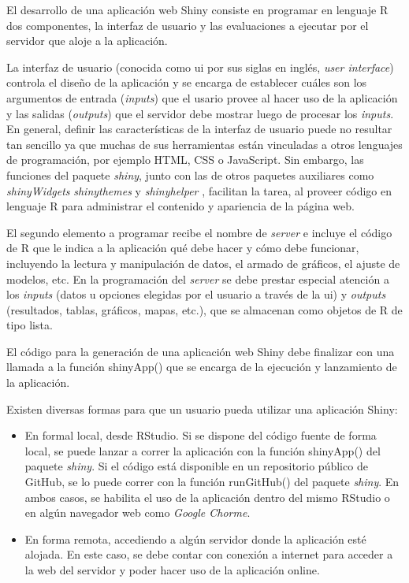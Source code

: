 El desarrollo de una aplicación web Shiny consiste en programar en lenguaje R dos componentes, la interfaz de usuario y las evaluaciones a ejecutar por el servidor que aloje a la aplicación.

La interfaz de usuario (conocida como ui por sus siglas en inglés, \emph{user interface}) controla el diseño de la aplicación y se encarga de establecer cuáles son los argumentos de entrada (\emph{inputs}) que el usario provee al hacer uso de la aplicación y las salidas (\emph{outputs}) que el servidor debe mostrar luego de procesar los \emph{inputs}. En general, definir las características de la interfaz de usuario puede no resultar tan sencillo ya que muchas de sus herramientas están vinculadas a otros lenguajes de programación, por ejemplo HTML, CSS o JavaScript. Sin embargo, las funciones del paquete \emph{shiny}, junto con las de otros paquetes auxiliares como \emph{shinyWidgets} \citep{Perrieretal2020} \emph{shinythemes} \citep{Chang2018} y \emph{shinyhelper} \citep{Mason2019}, facilitan la tarea, al proveer código en lenguaje R para administrar el contenido y apariencia de la página web.

El segundo elemento a programar recibe el nombre de \emph{server} e incluye el código de R que le indica a la aplicación qué debe hacer y cómo debe funcionar, incluyendo la lectura y manipulación de datos, el armado de gráficos, el ajuste de modelos, etc. En la programación del \emph{server} se debe prestar especial atención a los \emph{inputs} (datos u opciones elegidas por el usuario a través de la ui) y \emph{outputs} (resultados, tablas, gráficos, mapas, etc.), que se almacenan como objetos de R de tipo lista.

El código para la generación de una aplicación web Shiny debe finalizar con una llamada a la función \textcolor{fandango}{shinyApp()} que se encarga de la ejecución y lanzamiento de la aplicación.

Existen diversas formas para que un usuario pueda utilizar una aplicación Shiny:

\begin{itemize}

\item En formal local, desde RStudio. Si se dispone del código fuente de forma local, se puede lanzar a correr la aplicación con la función \textcolor{fandango}{shinyApp()} del paquete \emph{shiny}. Si el código está disponible en un repositorio público de GitHub, se lo puede correr con la función \textcolor{fandango}{runGitHub()} del paquete \emph{shiny}. En ambos casos, se habilita el uso de la aplicación dentro del mismo RStudio o en algún navegador web como \emph{Google Chorme}.

\item En forma remota, accediendo a algún servidor donde la aplicación esté alojada. En este caso, se debe contar con conexión a internet para acceder a la web del servidor y poder hacer uso de la aplicación online.

\end{itemize}





